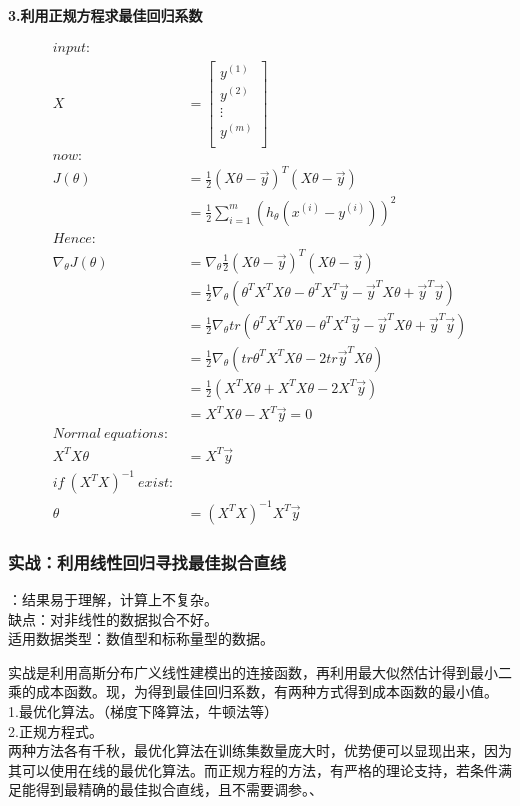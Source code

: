\noindent\textbf{3.利用正规方程求最佳回归系数}\par
\begin{equation}\nonumber
\begin{split}
input:&\\
X& = \left[\begin{array}{c}
    y^{(1)}\\
    y^{(2)}\\
    \vdots\\
    y^{(m)}\\
     \end{array}\right]\\
now:&\\
J(\theta)&=\frac{1}{2}(X\theta-\vec{y})^T (X\theta-\vec{y})\\
         &=\frac{1}{2}\sum_{i=1}^{m}(h_\theta(x^{(i)}-y^{(i)}))^2\\
Hence:&\\
\nabla_\theta J(\theta)&=\nabla_\theta\frac{1}{2}(X\theta-\vec{y})^T(X\theta-\vec{y})\\
                       &=\frac{1}{2}\nabla_\theta(\theta^TX^TX\theta-\theta^TX^T\vec{y}-\vec{y}^TX\theta+\vec{y}^T\vec{y})\\
                       &=\frac{1}{2}\nabla_\theta tr(\theta^TX^TX\theta-\theta^TX^T\vec{y}-\vec{y}^TX\theta+\vec{y}^T\vec{y})\\
                       &=\frac{1}{2}\nabla_\theta(tr\theta^TX^TX\theta-2tr\vec{y}^TX\theta)\\
                       &=\frac{1}{2}(X^TX\theta+X^TX\theta-2X^T\vec{y})\\
                       &=X^TX\theta-X^T\vec{y}=0\\
Normal~equations:&\\
X^TX\theta &=X^T\vec{y}\\
if~(X^TX)^{-1}~exist:&\\
\theta&=(X^TX)^{-1}X^T\vec{y}
\end{split}
\end{equation}

\subsubsection{实战：利用线性回归寻找最佳拟合直线}
：结果易于理解，计算上不复杂。\\
缺点：对非线性的数据拟合不好。\\
适用数据类型：数值型和标称量型的数据。

实战是利用高斯分布广义线性建模出的连接函数，再利用最大似然估计得到最小二乘的成本函数。现，为得到最佳回归系数，有两种方式得到成本函数的最小值。\\
1.最优化算法。（梯度下降算法，牛顿法等）\\
2.正规方程式。\\
两种方法各有千秋，最优化算法在训练集数量庞大时，优势便可以显现出来，因为其可以使用在线的最优化算法。而正规方程的方法，有严格的理论支持，若条件满足能得到最精确的最佳拟合直线，且不需要调参。、


